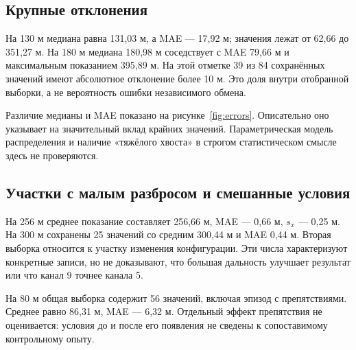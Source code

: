 \documentclass{misisarticle}
\begin{document}
\subsection{Крупные отклонения}

На 130 м медиана равна 131,03 м, а MAE --- 17,92 м; значения лежат от 62,66 до 351,27 м. На 180 м медиана 180,98 м соседствует с MAE 79,66 м и максимальным показанием 395,89 м. На этой отметке 39 из 84 сохранённых значений имеют абсолютное отклонение более 10 м. Это доля внутри отобранной выборки, а не вероятность ошибки независимого обмена.

Различие медианы и MAE показано на рисунке~\ref{fig:errors}. Описательно оно указывает на значительный вклад крайних значений. Параметрическая модель распределения и наличие «тяжёлого хвоста» в строгом статистическом смысле здесь не проверяются.

\subsection{Участки с малым разбросом и смешанные условия}

На 256 м среднее показание составляет 256,66 м, MAE --- 0,66 м, $s_x$ --- 0,25 м. На 300 м сохранены 25 значений со средним 300,44 м и MAE 0,44 м. Вторая выборка относится к участку изменения конфигурации. Эти числа характеризуют конкретные записи, но не доказывают, что большая дальность улучшает результат или что канал 9 точнее канала 5.

На 80 м общая выборка содержит 56 значений, включая эпизод с препятствиями. Среднее равно 86,31 м, MAE --- 6,32 м. Отдельный эффект препятствия не оценивается: условия до и после его появления не сведены к сопоставимому контрольному опыту.
\end{document}
